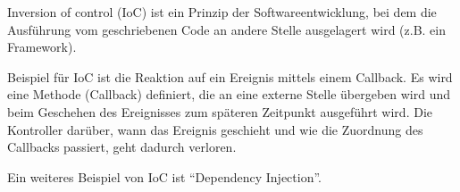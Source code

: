 Inversion of control (IoC) ist ein Prinzip der Softwareentwicklung, 
bei dem die Ausführung vom geschriebenen Code an andere Stelle ausgelagert wird
(z.B. ein Framework)\cite{IoCDefinition}.
% 

Beispiel für IoC ist die Reaktion auf ein Ereignis mittels einem Callback. 
Es wird eine Methode (Callback) definiert, die an eine externe Stelle übergeben wird und 
beim Geschehen des Ereignisses zum späteren Zeitpunkt ausgeführt wird. 
Die Kontroller darüber, wann das Ereignis geschieht und wie die Zuordnung des Callbacks passiert, geht dadurch verloren. 

Ein weiteres Beispiel von IoC ist ``Dependency Injection''.